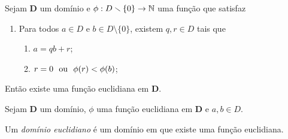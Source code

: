 \begin{proposition}
Sejam $\bm D$ um domínio e $\phi: D \smallsetminus \{0\} \to \mathbb{N}$ uma função que satisfaz
	\begin{enumerate}
	\item Para todos $a \in D$ e $b \in D \setminus \{0\}$, existem $q,r \in D$ tais que
		\begin{enumerate}
		\item $a=qb+r$;
		\item $r=0 \text{\ \ ou\ \ } \phi(r)<\phi(b)$;
		\end{enumerate}
	\end{enumerate}
Então existe uma função euclidiana em $\bm D$.
\end{proposition}
%
%
%
%
%
%
%
%

\begin{proposition}
Sejam $\bm D$ um domínio, $\phi$ uma função euclidiana em $\bm D$ e $a,b \in D$.
\end{proposition}

\begin{definition}
Um \emph{domínio euclidiano} é um domínio em que existe uma função euclidiana.
\end{definition}

